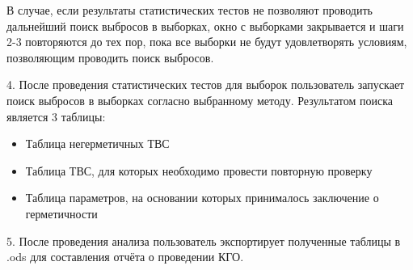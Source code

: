 В случае, если результаты статистических тестов не позволяют проводить дальнейший поиск выбросов в выборках, окно с выборками закрывается и шаги 2-3 повторяются до тех пор, пока все выборки не будут удовлетворять условиям, позволяющим проводить поиск выбросов.

4. После проведения статистических тестов для выборок пользователь запускает поиск выбросов в выборках согласно выбранному методу. Результатом поиска является 3 таблицы:
\begin{itemize}
	\item Таблица негерметичных ТВС
	\item Таблица ТВС, для которых необходимо провести повторную проверку
	\item Таблица параметров, на основании которых принималось заключение о герметичности
\end{itemize}

5. После проведения анализа пользователь экспортирует полученные таблицы в .ods для составления отчёта о проведении КГО.